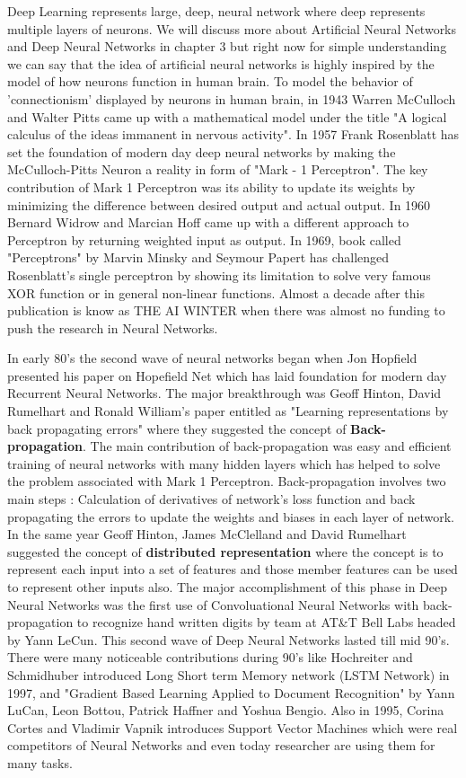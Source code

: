 \documentclass[a4paper]{article}
\begin{document}
Deep Learning represents large, deep, neural network where deep represents multiple layers of neurons. We will discuss more about Artificial Neural Networks and Deep Neural Networks in chapter 3 but right now for simple understanding we can say that the idea of artificial neural networks is highly inspired by the model of how neurons function in human brain. To model the behavior of 'connectionism' displayed by neurons in human brain, in 1943 Warren McCulloch and  Walter Pitts came up with a mathematical model under the title "A logical calculus of the ideas immanent in nervous activity". In 1957 Frank Rosenblatt has set the foundation of modern day deep neural networks by making the McCulloch-Pitts Neuron a reality in form of "Mark - 1 Perceptron". The key contribution of Mark 1 Perceptron was its ability to update its weights by minimizing the difference between desired output and actual output. In 1960 Bernard Widrow and Marcian Hoff came up with a different approach to Perceptron by returning weighted input as output. In 1969, book called "Perceptrons" by Marvin Minsky and Seymour Papert has challenged Rosenblatt's single perceptron by showing its limitation to solve very famous XOR function or in general non-linear functions. Almost a decade after this publication is know as THE AI WINTER when there was almost no funding to push the research in Neural Networks.

In early 80's the second wave of neural networks began when Jon Hopfield presented his paper on Hopefield Net which has laid foundation for modern day Recurrent Neural Networks. The major breakthrough was Geoff Hinton, David Rumelhart and Ronald William's paper entitled as "Learning representations by back propagating errors" where they suggested the concept of \textbf{Back-propagation}. The main contribution of back-propagation was easy and efficient training of neural networks with many hidden layers which has helped to solve the problem associated with Mark 1 Perceptron. Back-propagation involves two main steps : Calculation of derivatives of network's loss function and back propagating the errors to update the weights and biases in each layer of network. In the same year Geoff Hinton, James McClelland and David Rumelhart suggested the concept of \textbf{distributed representation} where the concept is to represent each input into a set of features and those member features can be used to represent other inputs also. The major accomplishment of this phase in Deep Neural Networks was the first use of Convoluational Neural Networks with back-propagation to recognize hand written digits by team at AT\&T Bell Labs headed by Yann LeCun. This second wave of Deep Neural Networks lasted till mid 90's. There were many noticeable contributions during 90's like Hochreiter and Schmidhuber introduced Long Short term Memory network (LSTM Network) in 1997, and "Gradient Based Learning Applied to Document Recognition" by Yann LuCan, Leon Bottou, Patrick Haffner and Yoshua Bengio. Also in 1995, Corina Cortes and Vladimir Vapnik introduces Support Vector Machines which were real competitors of Neural Networks and even today researcher are using them for many tasks. 
\end{document}
